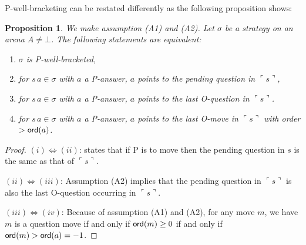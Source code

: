 \documentclass{article}
\newcommand{\pview}[1]{\ulcorner #1 \urcorner}
\newcommand{\ord}[1]{{\sf ord}(#1)}
\newtheorem{proposition}{Proposition}[section]
\theoremstyle{remark}
\theoremstyle{definition}
\begin{document}
P-well-bracketing can be restated differently as the following proposition shows:
\begin{proposition}
\label{prop:char_wellbrack}
\rm We make assumption (A1) and (A2).
Let $\sigma$ be a strategy on an arena $A\neq \bot$.
The following statements are equivalent:
\begin{enumerate}
\item[(i)] $\sigma$ is P-well-bracketed,
\item[(ii)] for $s \, a \in \sigma$ with $a$ a P-answer, $a$ points to the pending question in $\pview{s}$,
\item[(iii)] for $s \, a \in \sigma$ with $a$ a P-answer, $a$ points to the last O-question in $\pview{s}$.
\item[(iv)] for $s \, a \in \sigma$ with $a$ a P-answer, $a$ points to the last O-move in $\pview{s}$ with order $>\ord{a}$.
\end{enumerate}
\end{proposition}
\begin{proof}
$(i)\iff(ii)$: \cite[Lemma 2.1]{McC96b} states that if P is to move then the pending question in $s$ is the same as that of $\pview{s}$.

$(ii)\iff(iii)$: Assumption (A2) implies that the pending question in $\pview{s}$ is also the last O-question occurring in $\pview{s}$.

$(iii)\iff(iv)$: Because of assumption (A1) and (A2),
for any move $m$, we have $m$ is a question move
if and only if $\ord{m} \geq 0$ if and only if $\ord{m} > \ord{a} = -1$.
\end{proof}
\end{document}
